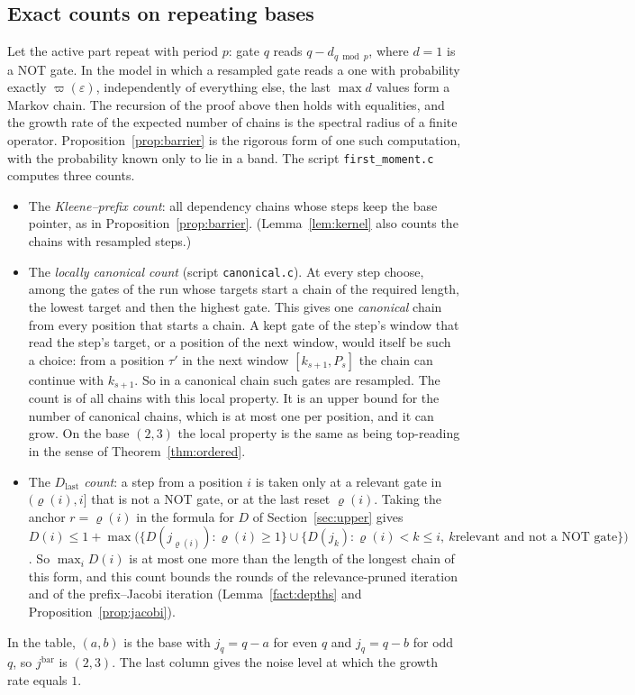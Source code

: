 \documentclass[11pt]{amsart}
\theoremstyle{definition}
\theoremstyle{remark}
\newcommand{\eps}{\varepsilon}
\begin{document}
\subsection{Exact counts on repeating bases}

Let the active part repeat with period $p$: gate $q$ reads $q-d_{q\bmod p}$, where $d=1$ is a NOT
gate. In the model in which a resampled gate reads a one with probability exactly $\varpi(\eps)$,
independently of everything else, the last $\max d$ values form a Markov chain. The recursion of
the proof above then holds with equalities, and the growth rate of the expected number of chains
is the spectral radius of a finite operator. Proposition~\ref{prop:barrier} is the rigorous form of
one such computation, with the probability known only to lie in a band. The script
\texttt{first\_moment.c} computes three counts.
\begin{itemize}[leftmargin=2.2em]
\item The \emph{Kleene--prefix count}: all dependency chains whose steps keep the base pointer,
as in Proposition~\ref{prop:barrier}. (Lemma~\ref{lem:kernel} also counts the chains with resampled
steps.)
\item The \emph{locally canonical count} (script \texttt{canonical.c}). At every step choose,
among the gates of the run whose targets start a chain of the required length, the lowest target
and then the highest gate. This gives one \emph{canonical} chain from every position that starts a
chain. A kept gate of the step's window that read the step's target, or a position of the next
window, would itself be such a choice: from a position $\tau'$ in the next window
$[k_{s+1},P_s]$ the chain can continue with $k_{s+1}$. So in a canonical chain such gates are
resampled. The count is of all chains with this local property. It is an upper bound for the
number of canonical chains, which is at most one per position, and it can grow. On the base
$(2,3)$ the local property is the same as being top-reading in the sense of
Theorem~\ref{thm:ordered}.
\item The \emph{$D_{\mathrm{last}}$ count}: a step from a position $i$ is taken only at a relevant
gate in $(\varrho(i),i]$ that is not a NOT gate, or at the last reset $\varrho(i)$. Taking the anchor
$r=\varrho(i)$ in the formula for $D$ of Section~\ref{sec:upper} gives
$D(i)\le1+\max\bigl(\{D(j_{\varrho(i)}):\varrho(i)\ge1\}\cup\{D(j_k):\varrho(i)<k\le i,\ k\text{
relevant and not a NOT gate}\}\bigr)$. So $\max_iD(i)$ is at most one more than the length of the longest chain
of this form, and this count bounds the rounds of the relevance-pruned iteration and of the
prefix--Jacobi iteration (Lemma~\ref{fact:depths} and Proposition~\ref{prop:jacobi}).
\end{itemize}
In the table, $(a,b)$ is the base with $j_q=q-a$ for even $q$ and $j_q=q-b$ for odd $q$, so
$j^{\mathrm{bar}}$ is $(2,3)$. The last column gives the noise level at which the growth rate
equals $1$.
\end{document}
